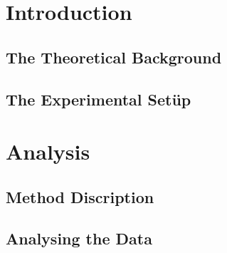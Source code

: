 \documentclass[a4paper,BCOR=15mm,bibtotoc]{scrbook}
\begin{document}
\frontmatter
  
  \tableofcontents

\mainmatter
  \chapter{Introduction}
  \blindtext
  \section{The Theoretical Background}
  \blindmathpaper
  \section{The Experimental Setüp}
  \blindmathpaper
  \chapter{Analysis}
  \blindtext
  \section{Method Discription}
  \blindmathpaper
  \section{Analysing the Data}
  \blindmathpaper

\backmatter
  \nocite{*}
  \printbibliography
\end{document}
